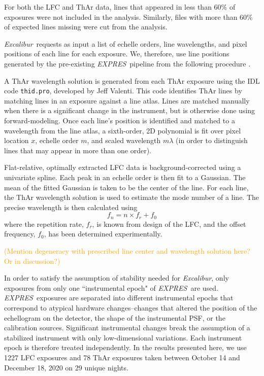 \documentclass[modern]{aastex63}
\newcommand{\project}[1]{\textsl{#1}}
\newcommand{\name}{\project{Excalibur}}
\newcommand{\acronym}[1]{{\small{#1}}}
\newcommand{\expres}{\project{\acronym{EXPRES}}}
\newcommand{\lz}[1]{\textcolor{orange}{#1}}
\begin{document}
For both the LFC and ThAr data, lines that appeared in less than 60\% of exposures were not included in the analysis.  Similarly, files with more than 60\% of expected lines missing were cut from the analysis.  

 \name\ requests as input a list of echelle orders, line wavelengths, and pixel positions of each line for each exposure.  We, therefore, use line positions generated by the pre-existing \expres\ pipeline from the following procedure \citep{petersburg2020}.
 
 A ThAr wavelength solution is generated from each ThAr exposure using the IDL code \texttt{thid.pro}, developed by Jeff Valenti.  This code identifies ThAr lines by matching lines in an exposure against a line atlas.  Lines are matched manually when there is a significant change in the instrument, but is otherwise done using forward-modeling.  Once each line's position is identified and matched to a wavelength from the line atlas, a sixth-order, 2D polynomial is fit over pixel location $x$, echelle order $m$, and scaled wavelength $m\lambda$ (in order to distinguish lines that may appear in more than one order).
 
 Flat-relative, optimally extracted LFC data is background-corrected using a univariate spline.  Each peak in an echelle order is then fit to a Gaussian.  The mean of the fitted Gaussian is taken to be the center of the line.  For each line, the ThAr wavelength solution is used to estimate the mode number of a line.  The precise wavelength is then calculated using
 \begin{equation}
 f_n = n \times  f_r + f_0
 \label{eq:lfc}
 \end{equation}
 where the repetition rate, $f_r$, is known from design of the LFC, and the offset frequency, $f_0$, has been determined experimentally.
 
 \lz{(Mention degeneracy with prescribed line center and wavelength solution here?  Or in discussion?)}
 
In order to satisfy the assumption of stability needed for \name, only exposures from only one ``instrumental epoch" of \expres\ are used.   \expres\ exposures are separated into different instrumental epochs that correspond to atypical hardware changes--changes that altered the position of the echellogram on the detector, the shape of the instrumental PSF, or the calibration sources.  Significant instrumental changes break the assumption of a stabilized instrument with only low-dimensional variations.  Each instrument epoch is therefore treated independently.  In the results presented here, we use 1227 LFC exposures and 78 ThAr exposures taken between October 14 and December 18, 2020 on 29 unique nights.
\end{document}
